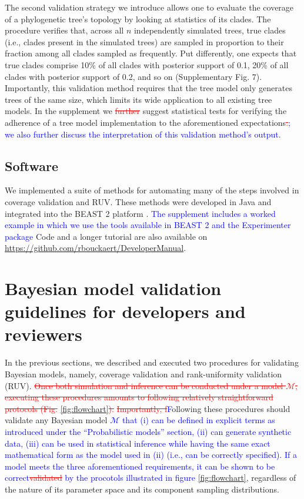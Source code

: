 \documentclass[oneside]{article}
\begin{document}
The second validation strategy we introduce allows one to evaluate the coverage of a phylogenetic tree's topology by looking at statistics of its clades.
The procedure verifies that, across all $n$ independently simulated trees, true clades (i.e., clades present in the simulated trees) are sampled in proportion to their fraction among all clades sampled as frequently.
Put differently, one expects that true clades comprise 10\% of all clades with posterior support of 0.1, 20\% of all clades with posterior support of 0.2, and so on (Supplementary Fig. 7).
Importantly, this validation method requires that the tree model only generates trees of the same size, which limits its wide application to all existing tree models.
In the supplement we \textcolor{red}{\st{further}} suggest statistical tests for verifying the adherence of a tree model implementation to the aforementioned expectations\textcolor{red}{\st{.}}\textcolor{blue}{; we also further discuss the interpretation of this validation method's output.}

\subsection*{Software}

We implemented a suite of methods for automating many of the steps involved in coverage validation and RUV.
These methods were developed in Java and integrated into the BEAST 2 platform \citep{beast25}.
\textcolor{blue}{The supplement includes a worked example in which we use the tools available in BEAST 2 and the Experimenter package}
Code and a longer tutorial are also available on \href{https://github.com/rbouckaert/DeveloperManual}{https://github.com/rbouckaert/DeveloperManual}.

\section*{Bayesian model validation guidelines for developers and reviewers}

In the previous sections, we described and executed two procedures for validating Bayesian models, namely, coverage validation and rank-uniformity validation (RUV).
\textcolor{red}{\st{Once both simulation and inference can be conducted under a model $\mathcal{M}$, executing these procedures amounts to following relatively straightforward protocols (Fig.}} \ref{fig:flowchart}\textcolor{red}{\st{).}}
\textcolor{red}{\st{Importantly, f}}\textcolor{blue}{F}ollowing these procedures should validate any Bayesian model \textcolor{blue}{$\mathcal{M}$ that (i) can be defined in explicit terms as introduced under the ``Probabilistic models'' section, (ii) can generate synthetic data, (iii) can be used in statistical inference while having the same exact mathematical form as the model used in (ii) (i.e., can be correctly specified).
If a model meets the three aforementioned requirements, it can be shown to be correct\textcolor{red}{\st{validated}} by the procotols illustrated in figure} \ref{fig:flowchart}, regardless of the nature of its parameter space and its component sampling distributions.
\end{document}
